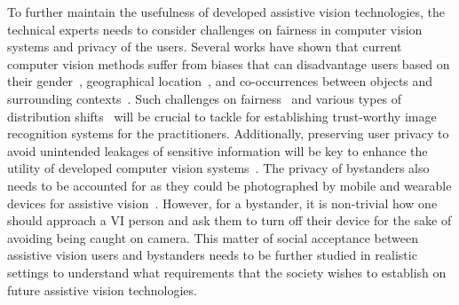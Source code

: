 
To further maintain the usefulness of developed assistive vision technologies, the technical experts needs to consider challenges on fairness in computer vision systems and privacy of the users. Several works have shown that current computer vision methods suffer from biases that can disadvantage users based on their gender~\cite{bolukbasi2016man, buolamwini2018gender, burns2018women}, geographical location~\cite{de2019does}, and co-occurrences between objects and surrounding contexts~\cite{singh2020don}. 
Such challenges on fairness~\cite{barocas2019fairml, holstein2019improving, yang2020towards} %
and various types of distribution shifts~\cite{wiles2021fine} %
will be crucial to tackle for establishing trust-worthy image recognition systems for the practitioners.
Additionally, preserving user privacy to avoid unintended leakages of sensitive information will be key to enhance the utility of developed computer vision systems~\cite{ahmed2015privacy, gurari2019vizwiz}. The privacy of bystanders also needs to be accounted for as they could be photographed by mobile and wearable devices for assistive vision~\cite{lee2020pedestrian, ahmed2018up}. However, for a bystander, it is non-trivial how one should approach a VI person and ask them to turn off their device for the sake of avoiding being caught on camera. 
This matter of social acceptance between assistive vision users and bystanders needs to be further studied in realistic settings to understand what requirements that the society wishes to establish on future assistive vision technologies.  



